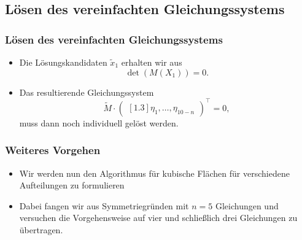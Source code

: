 \documentclass[11pt]{beamer}
\theoremstyle{custom}
\theoremstyle{custom}
\begin{document}
	\subsection*{Lösen des vereinfachten Gleichungssystems}
	\begin{frame}
		\frametitle{Lösen des vereinfachten Gleichungssystems}
		\begin{itemize}
			\item Die Lösungskandidaten $\tilde{x}_1$ erhalten wir aus
			\begin{equation*}
				\det\left(M(X_1)\right)  = 0.
			\end{equation*}
			\item Das resultierende Gleichungssystem
			\begin{equation*}\label{eqn:low_rank_system}
				\tilde{M}\cdot\begin{pmatrix}[1.3]
					\eta_1,\ldots,\eta_{10-n}
				\end{pmatrix}^\top =0,
			\end{equation*}
			muss dann noch individuell gelöst werden.
		\end{itemize}
	\end{frame}
	\begin{frame}
		\frametitle{Weiteres Vorgehen}
		\begin{itemize}
			\item Wir werden nun den Algorithmus für kubische Flächen für verschiedene Aufteilungen zu formulieren
			\pause
			\item Dabei fangen wir aus Symmetriegründen mit $n=5$ Gleichungen und versuchen die Vorgehensweise auf vier und schließlich drei Gleichungen zu übertragen. 
		\end{itemize}
	\end{frame}
\end{document}
